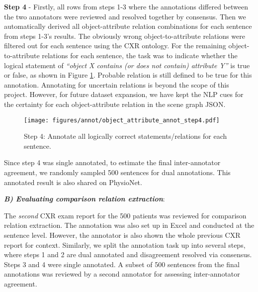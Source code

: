 \textbf{Step 4} - Firstly, all rows from steps 1-3 where the annotations differed between the two annotators were reviewed and resolved together by consensus. Then we automatically derived all object-attribute relation combinations for each sentence from steps 1-3's results. The obviously wrong object-to-attribute relations were filtered out for each sentence using the CXR ontology. For the remaining object-to-attribute relations for each sentence, the task was to indicate whether the logical statement of \textit{``object X contains (or does not contain) attribute Y''} is true or false, as shown in Figure \ref{fig:object-attribute-step4}. Probable relation is still defined to be true for this annotation. Annotating for uncertain relations is beyond the scope of this project. However, for future dataset expansion, we have kept the NLP cues for the certainty for each object-attribute relation in the scene graph JSON. 

\begin{figure}[!ht]
\centering
\texttt{[image: figures/annot/object\_attribute\_annot\_step4.pdf]}
\caption{Step 4: Annotate all logically correct statements/relations for each sentence.}
\label{fig:object-attribute-step4}
\end{figure}

Since step 4 was single annotated, to estimate the final inter-annotator agreement, we randomly sampled 500 sentences for dual annotations. This %
annotated result is also shared on PhysioNet.

\vspace{+10pt}
\textbf{\textit{B) Evaluating comparison relation extraction}}: 
\vspace{+5pt}

The \textit{second} CXR exam report for the 500 patients was reviewed for comparison relation extraction. The annotation was also set up in Excel and conducted at the sentence level. However, the annotator is also shown the whole previous CXR report for context. Similarly, we split the annotation task up into several steps, where steps 1 and 2 are dual annotated and disagreement resolved via consensus. Steps 3 and 4 were single annotated. A %
subset of 500 sentences from the final annotations was reviewed by a second annotator for assessing inter-annotator agreement.

